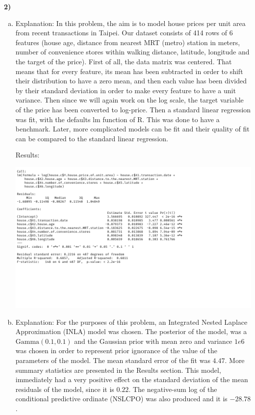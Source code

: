 \documentclass[12pt,a4paper]{article}
\begin{document}
\noindent\textbf{2)}
\begin{enumerate}[(a)]
\item
Explanation: In this problem, the aim is to model house prices per unit area from recent transactions in Taipei. Our dataset consists of 414 rows of 6 features (house age, distance from nearest MRT (metro) station in meters, number of convenience stores within walking distance, latitude, longitude and the target of the price). First of all, the data matrix was centered. That means that for every feature, its mean has been subtracted in order to shift their distribution to have a zero mean, and then each value has been divided by their standard deviation in order to make every feature to have a unit variance. Then since we will again work on the log scale, the target variable of the price has been converted to log-price. Then a standard linear regression was fit, with the defaults \textsf{lm} function of \textsf{R}. This was done to have a benchmark. Later, more complicated models can be fit and their quality of fit can be compared to the standard linear regression. 

Results:

\includegraphics[scale=0.28]{./images/2_table0.png}


\item
Explanation: For the purposes of this problem, an Integrated Nested Laplace Approximation (INLA) model was chosen. The posterior of the model, was a $\text{Gamma}(0.1,0.1)$ and the Gaussian prior with mean zero and variance $1e6$ was chosen in order to represent prior ignorance of the value of the parameters of the model. The mean standard error of the fit was $4.47$. More summary statistics are presented in the Results section. This model, immediately had a very positive effect on the standard deviation of the mean residuals of the model, since it is $0.22$. The negative-sum log of the conditional predictive ordinate (NSLCPO) was also produced and it is $-28.78$. 


\end{enumerate}
\end{document}
